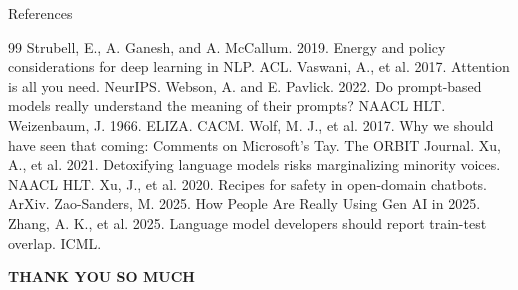 \documentclass[aspectratio=169]{beamer}
\begin{document}
\begin{frame}[allowframebreaks]{References}
\begin{thebibliography}{99}
     Strubell, E., A. Ganesh, and A. McCallum. 2019. Energy and policy considerations for deep learning in NLP. ACL.
     Vaswani, A., et al. 2017. Attention is all you need. NeurIPS.
     Webson, A. and E. Pavlick. 2022. Do prompt-based models really understand the meaning of their prompts? NAACL HLT.
     Weizenbaum, J. 1966. ELIZA. CACM.
     Wolf, M. J., et al. 2017. Why we should have seen that coming: Comments on Microsoft’s Tay. The ORBIT Journal.
     Xu, A., et al. 2021. Detoxifying language models risks marginalizing minority voices. NAACL HLT.
     Xu, J., et al. 2020. Recipes for safety in open-domain chatbots. ArXiv.
     Zao-Sanders, M. 2025. How People Are Really Using Gen AI in 2025.
     Zhang, A. K., et al. 2025. Language model developers should report train-test overlap. ICML.
    
    \end{thebibliography}
\end{frame}

\begin{frame}
    \begin{center}
        \Large \textbf{THANK YOU SO MUCH}
    \end{center}
\end{frame}
\end{document}
